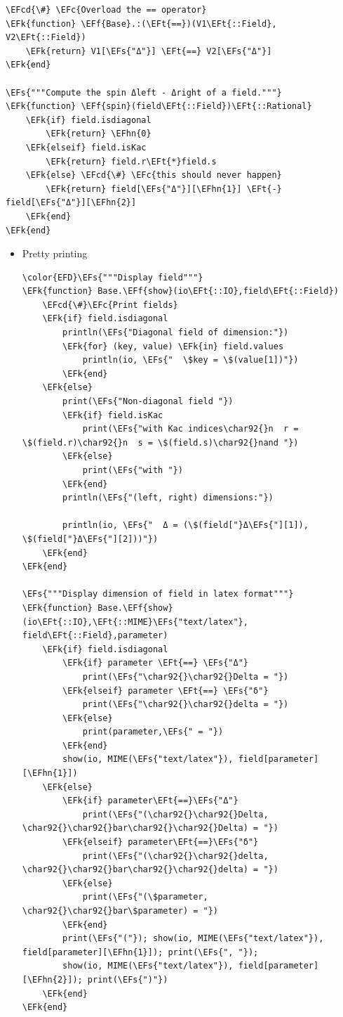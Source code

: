 \documentclass[a4paper]{article}
\numberwithin{equation}{section}
\newcommand{\EFc}[1]{\textcolor{EFc}{#1}} %
\newcommand{\EFcd}[1]{\textcolor{EFcd}{#1}} %
\newcommand{\EFs}[1]{\textcolor{EFs}{#1}} %
\newcommand{\EFk}[1]{\textcolor{EFk}{#1}} %
\newcommand{\EFf}[1]{\textcolor{EFf}{#1}} %
\newcommand{\EFt}[1]{\textcolor{EFt}{#1}} %
\newcommand{\EFhn}[1]{\textcolor{EFhn}{#1}} %
\begin{document}
\begin{Code}
\begin{Verbatim}
\EFcd{\#} \EFc{Overload the == operator}
\EFk{function} \EFf{Base}.:(\EFt{==})(V1\EFt{::Field}, V2\EFt{::Field})
    \EFk{return} V1[\EFs{"Δ"}] \EFt{==} V2[\EFs{"Δ"}]
\EFk{end}

\EFs{"""Compute the spin Δleft - Δright of a field."""}
\EFk{function} \EFf{spin}(field\EFt{::Field})\EFt{::Rational}
    \EFk{if} field.isdiagonal
        \EFk{return} \EFhn{0}
    \EFk{elseif} field.isKac
        \EFk{return} field.r\EFt{*}field.s
    \EFk{else} \EFcd{\#} \EFc{this should never happen}
        \EFk{return} field[\EFs{"Δ"}][\EFhn{1}] \EFt{-} field[\EFs{"Δ"}][\EFhn{2}]
    \EFk{end}
\EFk{end}
\end{Verbatim}
\end{Code}
\begin{itemize}
\item Pretty printing
\label{sec:org6d4dba2}

\begin{Code}
\begin{Verbatim}
\color{EFD}\EFs{"""Display field"""}
\EFk{function} Base.\EFf{show}(io\EFt{::IO},field\EFt{::Field})
    \EFcd{\#}\EFc{Print fields}
    \EFk{if} field.isdiagonal
        println(\EFs{"Diagonal field of dimension:"})
        \EFk{for} (key, value) \EFk{in} field.values
            println(io, \EFs{"  \$key = \$(value[1])"})
        \EFk{end}
    \EFk{else}
        print(\EFs{"Non-diagonal field "})
        \EFk{if} field.isKac
            print(\EFs{"with Kac indices\char92{}n  r = \$(field.r)\char92{}n  s = \$(field.s)\char92{}nand "})
        \EFk{else}
            print(\EFs{"with "})
        \EFk{end}
        println(\EFs{"(left, right) dimensions:"})

        println(io, \EFs{"  Δ = (\$(field["}Δ\EFs{"][1]), \$(field["}Δ\EFs{"][2]))"})
    \EFk{end}
\EFk{end}

\EFs{"""Display dimension of field in latex format"""}
\EFk{function} Base.\EFf{show}(io\EFt{::IO},\EFt{::MIME}\EFs{"text/latex"}, field\EFt{::Field},parameter)
    \EFk{if} field.isdiagonal
        \EFk{if} parameter \EFt{==} \EFs{"Δ"}
            print(\EFs{"\char92{}\char92{}Delta = "})
        \EFk{elseif} parameter \EFt{==} \EFs{"δ"}
            print(\EFs{"\char92{}\char92{}delta = "})
        \EFk{else}
            print(parameter,\EFs{" = "})
        \EFk{end}
        show(io, MIME(\EFs{"text/latex"}), field[parameter][\EFhn{1}])
    \EFk{else}
        \EFk{if} parameter\EFt{==}\EFs{"Δ"}
            print(\EFs{"(\char92{}\char92{}Delta, \char92{}\char92{}bar\char92{}\char92{}Delta) = "})
        \EFk{elseif} parameter\EFt{==}\EFs{"δ"}
            print(\EFs{"(\char92{}\char92{}delta, \char92{}\char92{}bar\char92{}\char92{}delta) = "})
        \EFk{else}
            print(\EFs{"(\$parameter, \char92{}\char92{}bar\$parameter) = "})
        \EFk{end}
        print(\EFs{"("}); show(io, MIME(\EFs{"text/latex"}), field[parameter][\EFhn{1}]); print(\EFs{", "});
        show(io, MIME(\EFs{"text/latex"}), field[parameter][\EFhn{2}]); print(\EFs{")"})
    \EFk{end}
\EFk{end}


\end{Verbatim}
\end{Code}
\end{itemize}
\end{document}
